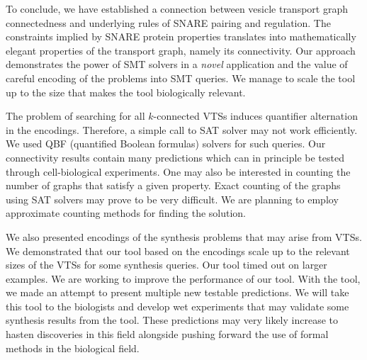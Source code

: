 \noindent 
To conclude, we have established a connection between vesicle transport graph connectedness and underlying rules of SNARE pairing and regulation. 
%
The constraints implied by SNARE protein properties translates into
mathematically elegant properties of the transport graph, namely its connectivity.
%
Our approach demonstrates the power of SMT solvers in a {\em novel} application and the value of careful encoding of the problems into SMT queries. 
We manage to scale the tool up to the size that makes the tool biologically relevant.
%

The problem of searching for all $k$-connected VTSs induces quantifier alternation in the encodings.
%
Therefore, a simple call to SAT solver may not work efficiently. 
%
We used QBF (quantified Boolean
formulas) solvers for such queries.
%
Our connectivity results contain many predictions which can in principle be tested through cell-biological experiments. 
One may also be interested in counting the number of graphs that satisfy
a given property. 
%
Exact counting of the graphs using SAT solvers may prove to be very
difficult. 
%
We are planning to employ approximate counting methods for finding the solution.
%

We also presented encodings of the synthesis problems that may arise from VTSs.
%
We demonstrated that our tool based on the encodings
scale up to the relevant sizes of the VTSs for some synthesis queries.
%
Our tool timed out on larger examples.
%
We are working to improve the performance of our tool.
%
%
With the tool, we made an attempt to present multiple new testable predictions. 
%
We will take this tool to the biologists and develop wet experiments that may
validate some synthesis results from the tool.
%
These predictions may very likely increase to hasten discoveries in this field
alongside pushing forward the use of formal methods in the biological field.
%

